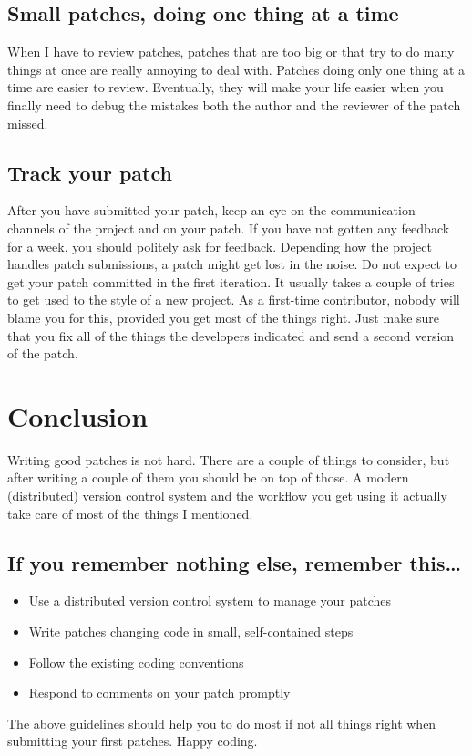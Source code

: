 \subsection*{Small patches, doing one thing at a time}

When I have to review patches, patches that are too big or that try to do many
things at once are really annoying to deal with. Patches doing only one thing at
a time are easier to review. Eventually, they will make your life easier when you
finally need to debug the mistakes both the author and the reviewer of the patch
missed.

\subsection*{Track your patch}

After you have submitted your patch, keep an eye on the communication channels
of the project and on your patch. If you have not gotten any feedback for a week,
you should politely ask for feedback. Depending how the project handles patch
submissions, a patch might get lost in the noise. Do not expect to get your patch
committed in the first iteration. It usually takes a couple of tries to get used
to the style of a new project. As a first-time contributor, nobody will blame
you for this, provided you get most of the things right. Just make sure that you
fix all of the things the developers indicated and send a second version of the
patch.

\section*{Conclusion}

Writing good patches is not hard. There are a couple of things to consider, but
after writing a couple of them you should be on top of those. A modern
(distributed) version control system and the workflow you get using it actually
take care of most of the things I mentioned.

\subsection*{If you remember nothing else, remember this\ldots}

\begin{itemize}
  \item Use a distributed version control system to manage your patches
  \item Write patches changing code in small, self-contained steps
  \item Follow the existing coding conventions
  \item Respond to comments on your patch promptly
\end{itemize}

The above guidelines should help you to do most if not all things right when
submitting your first patches. Happy coding.
